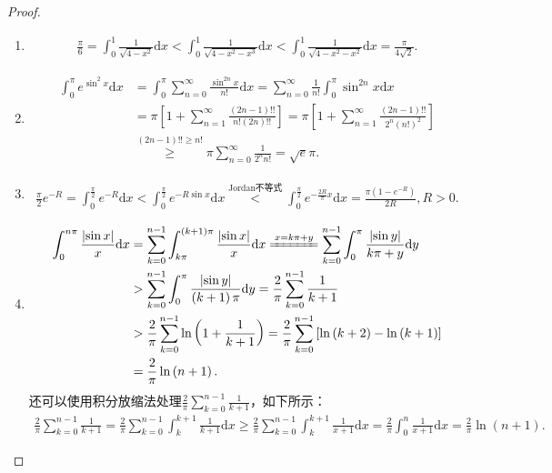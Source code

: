 \documentclass[../../main.tex]{subfiles}%
\begin{document}
\begin{proof}
\begin{enumerate}
\item \begin{align*}
\frac{\pi}{6}=\int_{0}^{1}\frac{1}{\sqrt{4 - x^{2}}}\mathrm{d}x < \int_{0}^{1}\frac{1}{\sqrt{4 - x^{2}-x^{3}}}\mathrm{d}x < \int_{0}^{1}\frac{1}{\sqrt{4 - x^{2}-x^{2}}}\mathrm{d}x=\frac{\pi}{4\sqrt{2}}.
\end{align*}

\item \begin{align*}
\int_0^{\pi}{e^{\sin ^2x}\mathrm{d}x}&=\int_0^{\pi}{\sum_{n=0}^{\infty}{\frac{\sin ^{2n}x}{n!}}\mathrm{d}x}=\sum_{n=0}^{\infty}{\frac{1}{n!}\int_0^{\pi}{\sin ^{2n}x\mathrm{d}x}}
\\
&=\pi \left[ 1+\sum_{n=1}^{\infty}{\frac{(2n-1)!!}{n!(2n)!!}} \right] =\pi \left[ 1+\sum_{n=1}^{\infty}{\frac{(2n-1)!!}{2^n\left( n! \right) ^2}} \right] 
\\
&\overset{(2n-1)!!\geqslant n!}{\geqslant}\pi \sum_{n=0}^{\infty}{\frac{1}{2^nn!}}=\sqrt{e}\pi .
\end{align*}

\item \begin{align*}
\frac{\pi}{2}e^{-R}=\int_{0}^{\frac{\pi}{2}}e^{-R}\mathrm{d}x < \int_{0}^{\frac{\pi}{2}}e^{-R\sin x}\mathrm{d}x\stackrel{\hyperref[theorem:Jordan不等式]{\text{Jordan不等式}}}{<}\int_{0}^{\frac{\pi}{2}}e^{-\frac{2R}{\pi}x}\mathrm{d}x=\frac{\pi(1 - e^{-R})}{2R}, R > 0.
\end{align*} 

\item \begin{align*}
\int_0^{n\pi}{\frac{\left| \sin x \right|}{x}\mathrm{d}x}&=\sum_{k=0}^{n-1}{\int_{k\pi}^{\left( k+1 \right) \pi}{\frac{\left| \sin x \right|}{x}\mathrm{d}x}}\xlongequal{x=k\pi +y}\sum_{k=0}^{n-1}{\int_0^{\pi}{\frac{\left| \sin y \right|}{k\pi +y}\mathrm{d}y}}
\\
&>\sum_{k=0}^{n-1}{\int_0^{\pi}{\frac{\left| \sin y \right|}{\left( k+1 \right) \pi}\mathrm{d}y}}=\frac{2}{\pi}\sum_{k=0}^{n-1}{\frac{1}{k+1}}
\\
&>\frac{2}{\pi}\sum_{k=0}^{n-1}{\ln \left( 1+\frac{1}{k+1} \right)}=\frac{2}{\pi}\sum_{k=0}^{n-1}{\left[ \ln \left( k+2 \right) -\ln \left( k+1 \right) \right]}
\\
&=\frac{2}{\pi}\ln \left( n+1 \right) .
\end{align*}
还可以使用积分放缩法处理$\frac{2}{\pi}\sum_{k=0}^{n-1}{\frac{1}{k+1}}$，如下所示：
\begin{align*}
\frac{2}{\pi}\sum_{k=0}^{n-1}{\frac{1}{k+1}}=\frac{2}{\pi}\sum_{k=0}^{n-1}{\int_k^{k+1}{\frac{1}{k+1}\mathrm{d}x}}\geqslant \frac{2}{\pi}\sum_{k=0}^{n-1}{\int_k^{k+1}{\frac{1}{x+1}\mathrm{d}x}}=\frac{2}{\pi}\int_0^n{\frac{1}{x+1}\mathrm{d}x}=\frac{2}{\pi}\ln \left( n+1 \right) .
\end{align*}
\end{enumerate}
\end{proof}
\end{document}
